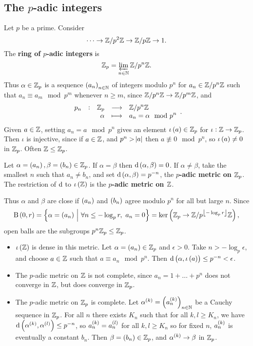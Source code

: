 \subsection{The \texorpdfstring{$ p $}{p}-adic integers}


Let $ p $ be a prime. Consider
$$ \dots \to \mathbb{Z} / p^2\mathbb{Z} \to \mathbb{Z} / p\mathbb{Z} \to 1. $$
The \textbf{ring of $ p $-adic integers} is
$$ \mathbb{Z}_p = \varprojlim_{n \in \mathbb{N}} \mathbb{Z} / p^n\mathbb{Z}. $$
Thus $ \alpha \in \mathbb{Z}_p $ is a sequence $ \br{a_n}_{n \in \NN} $ of integers modulo $ p^n $ for $ a_n \in \mathbb{Z} / p^n\mathbb{Z} $ such that $ a_n \equiv a_m \mod p^m $ whenever $ n \ge m $, since $ \mathbb{Z} / p^n\mathbb{Z} \to \mathbb{Z} / p^m\mathbb{Z} $, and
$$ \function[p_n]{\ZZ_p}{\ZZ / p^n\ZZ}{\alpha}{a_n = \alpha \mod p^n}. $$
Given $ a \in \mathbb{Z} $, setting $ a_n = a \mod p^n $ gives an element $ \iota\br{a} \in \ZZ_p $ for $ \iota : \mathbb{Z} \to \mathbb{Z}_p $. Then $ \iota $ is injective, since if $ a \in \mathbb{Z} $, and $ p^n > \abs{a} $ then $ a \not\equiv 0 \mod p^n $, so $ \iota\br{a} \ne 0 $ in $ \mathbb{Z}_p $. Often $ \mathbb{Z} \le \mathbb{Z}_p $.

\begin{definition*}
Let $ \alpha = \br{a_n}, \beta = \br{b_n} \in \ZZ_p $. If $ \alpha = \beta $ then $ \d\br{\alpha, \beta} = 0 $. If $ \alpha \ne \beta $, take the smallest $ n $ such that $ a_n \ne b_n $, and set $ \d\br{\alpha, \beta} = p^{-n} $, the \textbf{$ p $-adic metric on $ \mathbb{Z}_p $}. The restriction of $ \mathrm{d} $ to $ \iota\br{\ZZ} $ is the \textbf{$ p $-adic metric on $ \mathbb{Z} $}.
\end{definition*}

Thus $ \alpha $ and $ \beta $ are close if $ \br{a_n} $ and $ \br{b_n} $ agree modulo $ p^n $ for all but large $ n $. Since
$$ \B\br{0, r} = \cbr{\alpha = \br{a_n} \st \forall n \le -\log_p r, \ a_n = 0} = \ker \br{\ZZ_p \to \ZZ / p^{\fbr{-\log_p r}}\ZZ}, $$
open balls are the subgroups $ p^n\mathbb{Z}_p \le \mathbb{Z}_p $.

\begin{itemize}
\item $ \iota\br{\ZZ} $ is dense in this metric. Let $ \alpha = \br{a_n} \in \ZZ_p $ and $ \epsilon > 0 $. Take $ n > -\log_p \epsilon $, and choose $ a \in \mathbb{Z} $ such that $ a \equiv a_n \mod p^n $. Then $ \d\br{\alpha, \iota\br{a}} \le p^{-n} < \epsilon $.
\item The $ p $-adic metric on $ \mathbb{Z} $ is not complete, since $ a_n = 1 + \dots + p^n $ does not converge in $ \mathbb{Z} $, but does converge in $ \mathbb{Z}_p $.
\item The $ p $-adic metric on $ \mathbb{Z}_p $ is complete. Let $ \alpha^{\br{k}} = \br{a_n^{\br{k}}}_{n \in \NN} $ be a Cauchy sequence in $ \mathbb{Z}_p $. For all $ n $ there exists $ K_n $ such that for all $ k, l \ge K_n $, we have $ \d\br{\alpha^{\br{k}}, \alpha^{\br{l}}} \le p^{-n} $, so $ a_n^{\br{k}} = a_n^{\br{l}} $ for all $ k, l \ge K_n $ so for fixed $ n $, $ a_n^{\br{k}} $ is eventually a constant $ b_n $. Then $ \beta = \br{b_n} \in \ZZ_p $, and $ \alpha^{\br{k}} \to \beta $ in $ \mathbb{Z}_p $.
\end{itemize}

